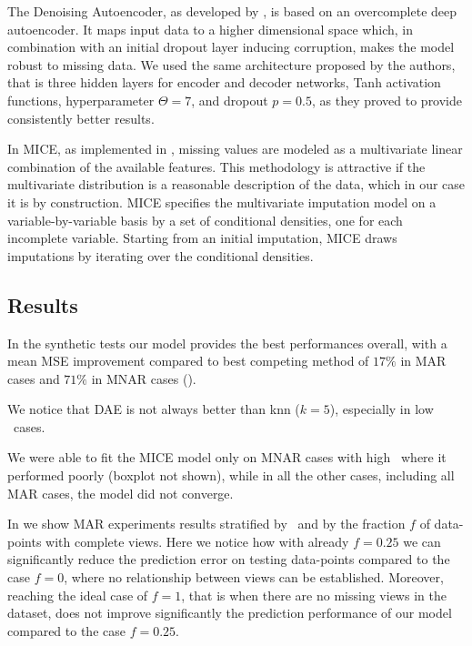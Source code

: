 The Denoising Autoencoder, as developed by \cite{dae}, is based on an overcomplete deep autoencoder.
It maps input data to a higher dimensional space which, in combination with an initial dropout layer inducing corruption, makes the model robust to missing data.
We used the same architecture proposed by the authors, that is three hidden layers for encoder and decoder networks, Tanh activation functions, hyperparameter $\Theta=7$, and dropout $p=0.5$, as they proved to provide consistently better results.

In MICE, as implemented in \cite{mice}, missing values are modeled as a multivariate linear combination of the available features.
This methodology is attractive if the multivariate distribution is a reasonable description of the data, which in our case it is by construction.
MICE specifies the multivariate imputation model on a variable-by-variable basis by a set of conditional densities, one for each incomplete variable.
Starting from an initial imputation, MICE draws imputations by iterating over the conditional densities.

\subsection{Results}


In the synthetic tests our model provides the best performances overall, with a mean MSE improvement compared to best competing method of $17\%$ in MAR cases and $71\%$ in MNAR cases ().

We notice that DAE is not always better than knn ($k=5$), especially in low \snr\ cases.

We were able to fit the MICE model only on MNAR cases with high \snr\, where it performed poorly (boxplot not shown), while in all the other cases, including all MAR cases, the model did not converge.

In  we show MAR experiments results stratified by \snr\ and by the fraction $f$ of data-points with complete views.
Here we notice how with already $f = 0.25$ we can significantly reduce the prediction error on testing data-points compared to the case $f=0$, where no relationship between views can be established.
Moreover, reaching the ideal case of $f=1$, that is when there are no missing views in the dataset, does not improve significantly the prediction performance of our model compared to the case $f = 0.25$.


